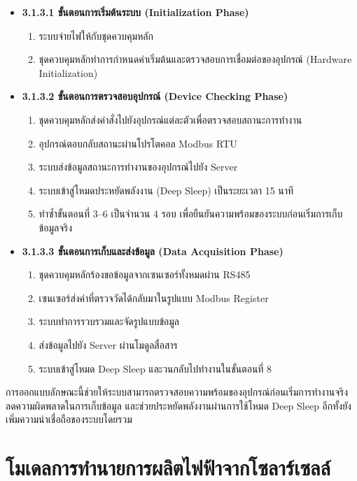 \begin{itemize}
    \item[]\textbf{3.1.3.1 ขั้นตอนการเริ่มต้นระบบ (Initialization Phase)} 
    \begin{enumerate}
        \item ระบบจ่ายไฟให้กับชุดควบคุมหลัก
        \item ชุดควบคุมหลักทำการกำหนดค่าเริ่มต้นและตรวจสอบการเชื่อมต่อของอุปกรณ์ (Hardware Initialization)
    \end{enumerate}

    \item[]\textbf{3.1.3.2 ขั้นตอนการตรวจสอบอุปกรณ์ (Device Checking Phase)}
    \begin{enumerate}
        \item ชุดควบคุมหลักส่งคำสั่งไปยังอุปกรณ์แต่ละตัวเพื่อตรวจสอบสถานะการทำงาน
        \item อุปกรณ์ตอบกลับสถานะผ่านโปรโตคอล Modbus RTU
        \item ระบบส่งข้อมูลสถานะการทำงานของอุปกรณ์ไปยัง Server
        \item ระบบเข้าสู่โหมดประหยัดพลังงาน (Deep Sleep) เป็นระยะเวลา 15 นาที
        \item ทำซ้ำขั้นตอนที่ 3–6 เป็นจำนวน 4 รอบ เพื่อยืนยันความพร้อมของระบบก่อนเริ่มการเก็บข้อมูลจริง
    \end{enumerate}

    \item[]\textbf{3.1.3.3 ขั้นตอนการเก็บและส่งข้อมูล (Data Acquisition Phase)}
    \begin{enumerate}
        \item ชุดควบคุมหลักร้องขอข้อมูลจากเซนเซอร์ทั้งหมดผ่าน RS485
        \item เซนเซอร์ส่งค่าที่ตรวจวัดได้กลับมาในรูปแบบ Modbus Register
        \item ระบบทำการรวบรวมและจัดรูปแบบข้อมูล
        \item ส่งข้อมูลไปยัง Server ผ่านโมดูลสื่อสาร
        \item ระบบเข้าสู่โหมด Deep Sleep และวนกลับไปทำงานในขั้นตอนที่ 8
    \end{enumerate}
\end{itemize}

\hspace{\parindent} การออกแบบลักษณะนี้ช่วยให้ระบบสามารถตรวจสอบความพร้อมของอุปกรณ์ก่อนเริ่มการทำงานจริง ลดความผิดพลาดในการเก็บข้อมูล และช่วยประหยัดพลังงานผ่านการใช้โหมด Deep Sleep อีกทั้งยังเพิ่มความน่าเชื่อถือของระบบโดยรวม

\newpage
\section{โมเดลการทำนายการผลิตไฟฟ้าจากโซลาร์เซลล์}
